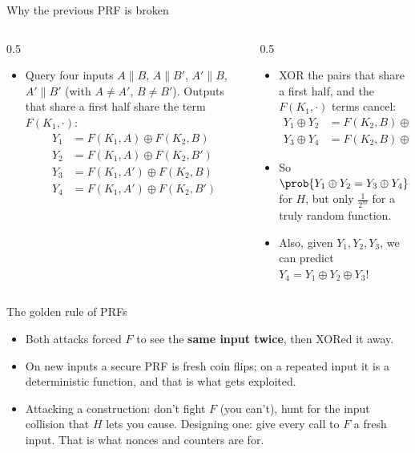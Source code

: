\ifdefined\PRESENTATION\else\PassOptionsToClass{handout}{beamer}\fi\documentclass[aspectratio=169, lualatex]{beamer}
\begin{document}
\begin{frame}{Why the previous PRF is broken}
	\begin{columns}[c]
		\begin{column}{0.5\textwidth}
			\begin{itemize}[<+->]
				\item Query four inputs $A\|B$, $A\|B'$, $A'\|B$, $A'\|B'$ (with $A \neq A'$, $B \neq B'$). Outputs that share a first half share the term $F(K_1, \cdot)$:
				      \begin{align*}
					      Y_1 & = F(K_1, A) \oplus F(K_2, B)   \\
					      Y_2 & = F(K_1, A) \oplus F(K_2, B')  \\
					      Y_3 & = F(K_1, A') \oplus F(K_2, B)  \\
					      Y_4 & = F(K_1, A') \oplus F(K_2, B')
				      \end{align*}
			\end{itemize}
		\end{column}
		\begin{column}{0.5\textwidth}
			\begin{itemize}[<+->]
				\item XOR the pairs that share a first half, and the $F(K_1, \cdot)$ terms cancel:
				      \begin{align*}
					      Y_1 \oplus Y_2 & = F(K_2, B) \oplus F(K_2, B') \\
					      Y_3 \oplus Y_4 & = F(K_2, B) \oplus F(K_2, B')
				      \end{align*}
				\item So $\prob{Y_1 \oplus Y_2 = Y_3 \oplus Y_4} = 1$ for $H$, but only $\frac{1}{2^m}$ for a truly random function.
				\item Also, given $Y_1, Y_2, Y_3$, we can predict $Y_4 = Y_1 \oplus Y_2 \oplus Y_3$!
			\end{itemize}
		\end{column}
	\end{columns}
\end{frame}

\begin{frame}{The golden rule of PRFs}
	\begin{itemize}[<+->]
		\item Both attacks forced $F$ to see the \textbf{same input twice}, then XORed it away.
		\item On new inputs a secure PRF is fresh coin flips; on a repeated input it is a deterministic function, and that is what gets exploited.
		\item Attacking a construction: don't fight $F$ (you can't), hunt for the input collision that $H$ lets you cause. Designing one: give every call to $F$ a fresh input. That is what nonces and counters are for.
	\end{itemize}
\end{frame}
\end{document}

